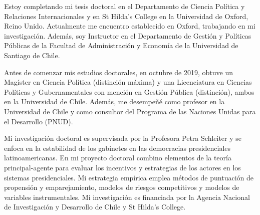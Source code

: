 




\vspace{3mm}

\begin{cvparagraph}

Estoy completando mi tesis doctoral en el Departamento de Ciencia Política y Relaciones Internacionales y en St Hilda’s College en la Universidad de Oxford, Reino Unido. Actualmente me encuentro establecido en Oxford, trabajando en mi investigación. Además, soy Instructor en el Departamento de Gestión y Políticas Públicas de la Facultad de Administración y Economía de la Universidad de Santiago de Chile.

Antes de comenzar mis estudios doctorales, en octubre de 2019, obtuve un Magíster en Ciencia Política (distinción máxima) y una Licenciatura en Ciencias Políticas y Gubernamentales con mención en Gestión Pública (distinción), ambos en la Universidad de Chile. Además, me desempeñé como profesor en la Universidad de Chile y como consultor del Programa de las Naciones Unidas para el Desarrollo (PNUD).

Mi investigación doctoral es supervisada por la Profesora Petra Schleiter y se enfoca en la estabilidad de los gabinetes en las democracias presidenciales latinoamericanas. En mi proyecto doctoral combino elementos de la teoría principal-agente para evaluar los incentivos y estrategias de los actores en los sistemas presidenciales. Mi estrategia empírica emplea métodos de puntuación de propensión y emparejamiento, modelos de riesgos competitivos y modelos de variables instrumentales. Mi investigación es financiada por la Agencia Nacional de Investigación y Desarrollo de Chile y St Hilda's College.
\vspace{1mm}
\end{cvparagraph}
